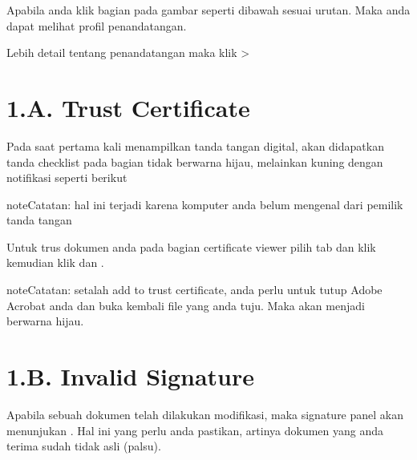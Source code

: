 \documentclass[letterpaper,10pt,bahasai]{sphinxmanual}
\begin{document}
Apabila anda klik bagian pada gambar seperti dibawah sesuai urutan. Maka anda dapat melihat profil penandatangan.

\noindent{}

\noindent{}

Lebih detail tentang penandatangan maka klik  \sphinxhyphen{}\textgreater{} 

\noindent{}


\section{1.A. Trust Certificate}
\label{\detokenize{verifikasi:a-trust-certificate}}
Pada saat pertama kali menampilkan tanda tangan digital, akan didapatkan tanda checklist pada bagian 
tidak berwarna hijau, melainkan kuning dengan notifikasi seperti berikut

\noindent{}

\begin{sphinxadmonition}{note}{Catatan:}
hal ini terjadi karena komputer anda belum mengenal  dari pemilik tanda tangan
\end{sphinxadmonition}

Untuk trus dokumen anda pada bagian certificate viewer pilih tab  dan klik  kemudian
klik  dan .

\begin{sphinxadmonition}{note}{Catatan:}
setalah add to trust certificate, anda perlu untuk tutup Adobe Acrobat anda dan buka kembali file yang anda tuju. Maka  akan menjadi berwarna hijau.
\end{sphinxadmonition}


\section{1.B. Invalid Signature}
\label{\detokenize{verifikasi:b-invalid-signature}}
Apabila sebuah dokumen telah dilakukan modifikasi, maka signature panel akan menunjukan .
Hal ini yang perlu anda pastikan, artinya dokumen yang anda terima sudah tidak asli (palsu).
\end{document}
